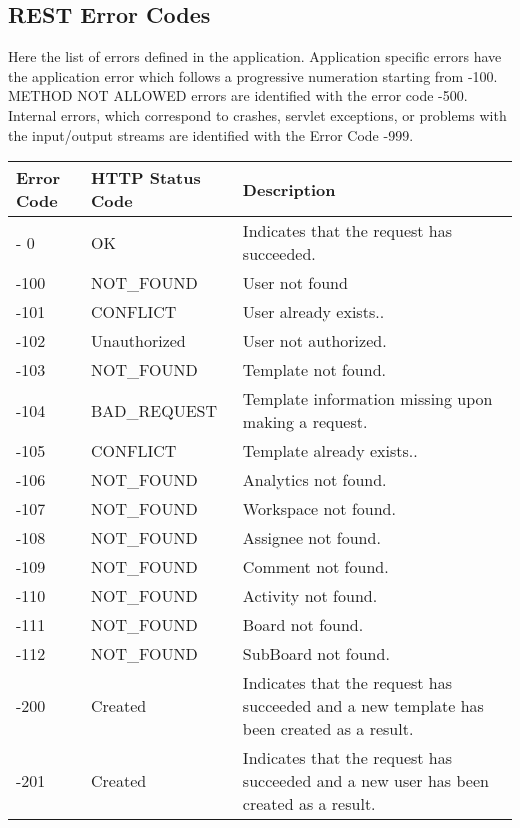 \subsection{REST Error Codes}

Here the list of errors defined in the application. Application specific errors have the application error which follows a progressive numeration starting from -100. METHOD NOT ALLOWED errors are identified with the error code -500. Internal errors, which correspond to crashes, servlet exceptions, or problems with the input/output streams are identified with the Error Code -999.

\begin{longtable}{|p{}|p{} |p{}|} 
\hline
\textbf{Error Code} & \textbf{HTTP Status Code} & \textbf{Description} \\\hline
-  0  & OK                       & Indicates that the request has succeeded. \\ \hline
-100  & NOT\_FOUND               & User not found\\ \hline
-101  & CONFLICT                 & User already exists.. \\ \hline
-102  & Unauthorized             & User not authorized. \\ \hline
-103  & NOT\_FOUND               & Template not found.\\ \hline
-104  & BAD\_REQUEST             & Template information missing upon making a request. \\ \hline
-105  & CONFLICT                 & Template already exists.. \\ \hline
-106  & NOT\_FOUND               & Analytics not found.\\ \hline
-107  & NOT\_FOUND               & Workspace not found.\\ \hline
-108  & NOT\_FOUND               & Assignee not found.\\ \hline
-109  & NOT\_FOUND               & Comment not found.\\ \hline
-110  & NOT\_FOUND               & Activity not found.\\ \hline
-111  & NOT\_FOUND               & Board not found.\\ \hline
-112  & NOT\_FOUND               & SubBoard not found.\\ \hline
-200  & Created                  & Indicates that the request has succeeded and a new template has been created as a result. \\ \hline
-201  & Created                  & Indicates that the request has succeeded and a new user has been created as a result. \\ \hline

\end{longtable}
